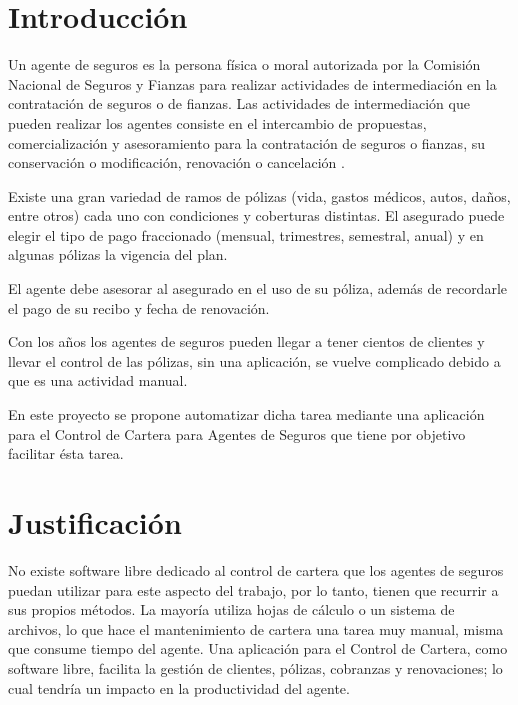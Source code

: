 

\setcounter{page}{1}
\section{Introducción}%
Un agente de seguros es la persona física o moral autorizada por la Comisión Nacional de Seguros y Fianzas para realizar actividades de intermediación en la contratación de seguros o de fianzas. Las actividades de intermediación que pueden realizar los agentes consiste en el intercambio de propuestas, comercialización y asesoramiento para la contratación de seguros o fianzas, su conservación o modificación, renovación o cancelación \cite{www:reg-agentes}.

Existe una gran variedad de ramos de pólizas (vida, gastos médicos, autos, daños, entre otros) cada uno con condiciones y coberturas distintas. El asegurado puede elegir el tipo de pago fraccionado (mensual, trimestres, semestral, anual) y en algunas pólizas la vigencia del plan.

El agente debe asesorar al asegurado en el uso de su póliza, además de recordarle el pago de su recibo y fecha de renovación.

Con los años los agentes de seguros pueden llegar a tener cientos de clientes y llevar el control de las pólizas, sin una aplicación, se vuelve complicado debido a que es una actividad manual.

En este proyecto se propone automatizar dicha tarea mediante una aplicaci\'on para el Control de Cartera para Agentes de Seguros que tiene por objetivo facilitar \'esta tarea.

\section{Justificación}

No existe software libre dedicado al control de cartera que los agentes de seguros puedan utilizar para este aspecto del trabajo, por lo tanto, tienen que recurrir a sus propios métodos. La mayoría utiliza hojas de cálculo o un sistema de archivos, lo que hace el mantenimiento de cartera una tarea muy manual, misma que consume tiempo del agente.
Una aplicación para el Control de Cartera, como software libre, facilita la gestión de clientes, pólizas, cobranzas y renovaciones; lo cual tendría un impacto en la productividad del agente.

